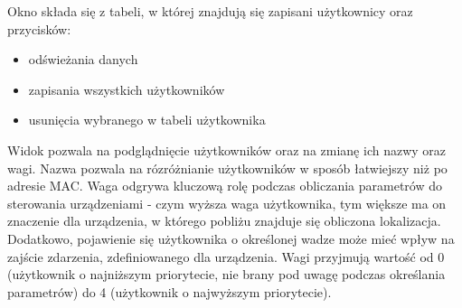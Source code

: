 Okno składa się z tabeli, w której znajdują się zapisani użytkownicy oraz przycisków:
\begin{itemize}
	\item odświeżania danych
	\item zapisania wszystkich użytkowników
	\item usunięcia wybranego w tabeli użytkownika
\end{itemize}
Widok pozwala na podglądnięcie użytkowników oraz na zmianę ich nazwy oraz wagi. Nazwa pozwala na rózróżnianie użytkowników w sposób łatwiejszy niż po adresie MAC. Waga odgrywa kluczową rolę podczas obliczania parametrów do sterowania urządzeniami - czym wyższa waga użytkownika, tym większe ma on znaczenie dla urządzenia, w którego pobliżu znajduje się obliczona lokalizacja. Dodatkowo, pojawienie się użytkownika o określonej wadze może mieć wpływ na zajście zdarzenia, zdefiniowanego dla urządzenia. Wagi przyjmują wartość od 0 (użytkownik o najniższym priorytecie, nie brany pod uwagę podczas określania parametrów) do 4 (użytkownik o najwyższym priorytecie).

